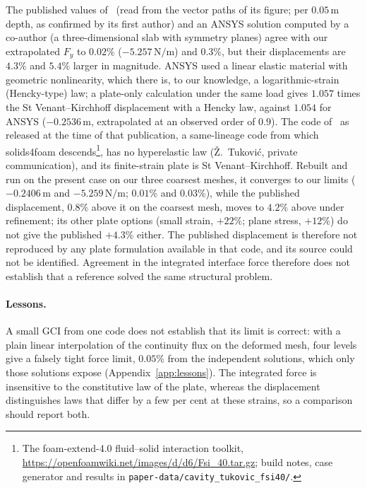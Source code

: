 The published values of~\citet{Tukovic2018} (read from the vector paths of its figure; per $0.05\,\mathrm{m}$ depth, as confirmed by its first author) and an ANSYS solution computed by a co-author (a three-dimensional slab with symmetry planes) agree with our extrapolated $F_y$ to $0.02\%$ ($-5.257\,\mathrm{N/m}$) and $0.3\%$, but their displacements are $4.3\%$ and $5.4\%$ larger in magnitude.
ANSYS used a linear elastic material with geometric nonlinearity, which there is, to our knowledge, a logarithmic-strain (Hencky-type) law; a plate-only calculation under the same load gives $1.057$ times the St Venant--Kirchhoff displacement with a Hencky law, against $1.054$ for ANSYS ($-0.2536\,\mathrm{m}$, extrapolated at an observed order of $0.9$).
The code of~\citet{Tukovic2018} as released at the time of that publication, a same-lineage code from which solids4foam descends\footnote{The foam-extend-4.0 fluid--solid interaction toolkit, \url{https://openfoamwiki.net/images/d/d6/Fsi_40.tar.gz}; build notes, case generator and results in \texttt{paper-data/cavity\_tukovic\_fsi40/}.}, has no hyperelastic law (Ž.~Tuković, private communication), and its finite-strain plate is St Venant--Kirchhoff.
Rebuilt and run on the present case on our three coarsest meshes, it converges to our limits ($-0.2406\,\mathrm{m}$ and $-5.259\,\mathrm{N/m}$; $0.01\%$ and $0.03\%$), while the published displacement, $0.8\%$ above it on the coarsest mesh, moves to $4.2\%$ above under refinement; its other plate options (small strain, $+22\%$; plane stress, $+12\%$) do not give the published $+4.3\%$ either.
The published displacement is therefore not reproduced by any plate formulation available in that code, and its source could not be identified.
Agreement in the integrated interface force therefore does not establish that a reference solved the same structural problem.

\paragraph{Lessons.}
A small GCI from one code does not establish that its limit is correct: with a plain linear interpolation of the continuity flux on the deformed mesh, four levels give a falsely tight force limit, $0.05\%$ from the independent solutions, which only those solutions expose (Appendix~\ref{app:lessons}).
The integrated force is insensitive to the constitutive law of the plate, whereas the displacement distinguishes laws that differ by a few per cent at these strains, so a comparison should report both.

